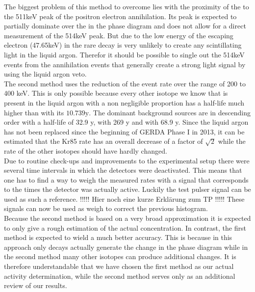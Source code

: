 The biggest problem of this method to overcome lies with the proximity of the  to the 511keV peak of the positron electron annihilation. 
Its peak is expected to partially dominate over the  in the phase diagram and does not allow for a direct measurement of the 514keV peak. 
But due to the low energy of the escaping electron (47.65keV) in the rare decay is very unlikely to create any scintillating light in the liquid argon. 
Therefor it should be possible to single out the 514keV events from the annihilation events that generally create a strong light signal by using the liquid argon veto.
\\

The second method uses the reduction of the event rate over the range of 200 to 400 keV. 
This is only possible because every other isotope we know that is present in the liquid argon with a non negligible proportion has a half-life much higher than  with its \(10.739\mathrm{y}\). 
The dominant background sources are in descending order  with a half-life of 32.9 y,  with 269 y and  with 68.9 y. 
Since the liquid argon has not been replaced since the beginning of GERDA Phase I in 2013, it can be estimated that the Kr85 rate has  an overall decrease of a factor of \(\sqrt{2}\) while the rate of the other isotopes should have hardly changed.
\\

Due to routine check-ups and improvements to the experimental setup there were several time intervals in which the detectors were deactivated. 
This means that one has to find a way to weigh the measured rates with a signal that corresponds to the times the detector was actually active. 
Luckily the test pulser signal can be used as such a reference. 
!!!!! Hier noch eine kurze Erklärung zum TP !!!!!
These signals can now be used as weigh to correct the previous histogram.
\\

Because the second method is based on a very broad approximation it is expected to only give a rough estimation of the actual concentration. 
In contrast, the first method is expected to wield a much better accuracy.
This is because in this approach only  decays actually generate the change in the phase diagram while in the second method many other isotopes can produce additional changes.
It is therefore understandable that we have chosen the first method as our actual activity determination, while the second method serves only as an additional review of our results.

